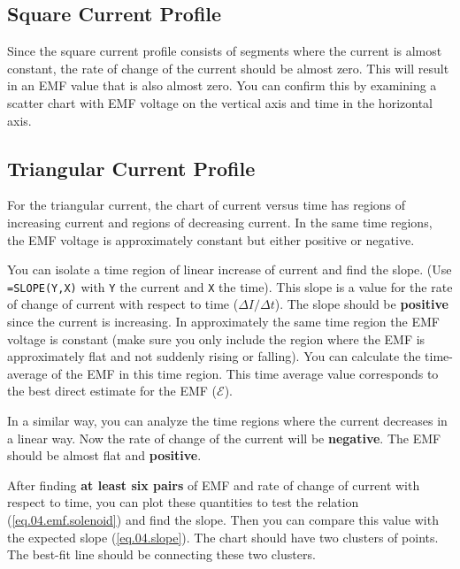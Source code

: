 \subsection{Square Current Profile}
Since the square current profile consists of segments where the current is almost constant, the rate of change of the current should be almost zero. This will result in an EMF value that is also almost zero. You can confirm this by examining a scatter chart with EMF voltage on the vertical axis and time in the horizontal axis.
\subsection{Triangular Current Profile}
For the triangular current, the chart of current versus time has regions of increasing current and regions of decreasing current. In the same time regions, the EMF voltage is approximately constant but either positive or negative.

You can isolate a time region of linear increase of current and find the slope. (Use \texttt{=SLOPE(Y,X)} with \texttt{Y} the current and \texttt{X} the time). This slope is a value for the rate of change of current with respect to time ($\Delta I / \Delta t$). The slope should be \textbf{positive} since the current is increasing. In approximately the same time region the EMF voltage is constant (make sure you only include the region where the EMF is approximately flat and not suddenly rising or falling). You can calculate the time-average of the EMF in this time region. This time average value corresponds to the best direct estimate for the EMF ($\mathcal{E}$).

In a similar way, you can analyze the time regions where the current decreases in a linear way. Now the rate of change of the current will be \textbf{negative}. The EMF should be almost flat and \textbf{positive}.

After finding \textbf{at least six pairs} of EMF and rate of change of current with respect to time, you can plot these quantities to test the relation (\ref{eq.04.emf.solenoid}) and find the slope. Then you can compare this value with the expected slope (\ref{eq.04.slope}). The chart should have two clusters of points. The best-fit line should be connecting these two clusters.
